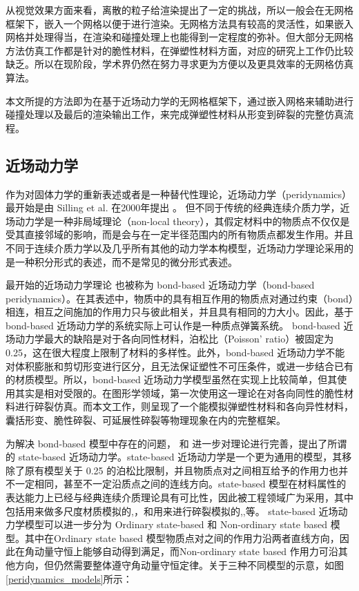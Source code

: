 从视觉效果方面来看，离散的粒子给渲染提出了一定的挑战，所以一般会在无网格框架下，嵌入一个网格以便于进行渲染。无网格方法具有较高的灵活性，如果嵌入网格并处理得当，在渲染和碰撞处理上也能得到一定程度的弥补。但大部分无网格方法仿真工作都是针对的脆性材料，在弹塑性材料方面，对应的研究上工作仍比较缺乏。所以在现阶段，学术界仍然在努力寻求更为方便以及更具效率的无网格仿真算法。

本文所提的方法即为在基于近场动力学的无网格框架下，通过嵌入网格来辅助进行碰撞处理以及最后的渲染输出工作，来完成弹塑性材料从形变到碎裂的完整仿真流程。

\subsection{近场动力学}
\label{pdm_history}

作为对固体力学的重新表述或者是一种替代性理论，近场动力学（peridynamics）最开始是由 Silling et al. 在2000年提出 。 但不同于传统的经典连续介质力学，近场动力学是一种非局域理论（non-local theory），其假定材料中的物质点不仅仅是受其直接邻域的影响，而是会与在一定半径范围内的所有物质点都发生作用。并且不同于连续介质力学以及几乎所有其他的动力学本构模型，近场动力学理论采用的是一种积分形式的表述，而不是常见的微分形式表述。

最开始的近场动力学理论 也被称为 bond-based 近场动力学（bond-based peridynamics）。在其表述中，物质中的具有相互作用的物质点对通过约束（bond）相连，相互之间施加的作用力只与彼此相关，并且具有相同的力大小。因此，基于 bond-based 近场动力学的系统实际上可认作是一种质点弹簧系统。 bond-based 近场动力学最大的缺陷是对于各向同性材料，泊松比（Poisson' ratio）被固定为 0.25，这在很大程度上限制了材料的多样性。此外，bond-based 近场动力学不能对体积膨胀和剪切形变进行区分，且无法保证塑性不可压条件，或进一步结合已有的材质模型。所以，bond-based 近场动力学模型虽然在实现上比较简单，但其使用其实是相对受限的。在图形学领域，第一次使用这一理论在对各向同性的脆性材料进行碎裂仿真。而本文工作，则呈现了一个能模拟弹塑性材料和各向异性材料，囊括形变、脆性碎裂、可延展性碎裂等物理现象在内的完整框架。

为解决 bond-based 模型中存在的问题， 和 进一步对理论进行完善，提出了所谓的 state-based 近场动力学。state-based 近场动力学是一个更为通用的模型，其移除了原有模型关于 0.25 的泊松比限制，并且物质点对之间相互给予的作用力也并不一定相同，甚至不一定沿质点之间的连线方向。state-based 模型在材料属性的表达能力上已经与经典连续介质理论具有可比性，因此被工程领域广为采用，其中包括用来做多尺度材质模拟的,，和用来进行碎裂模拟的,,等。
state-based 近场动力学模型可以进一步分为 Ordinary state-based 和 Non-ordinary state based 模型。其中在Ordinary state based 模型物质点对之间的作用力沿两者直线方向，因此在角动量守恒上能够自动得到满足，而Non-ordinary state based 作用力可沿其他方向，但仍然需要整体遵守角动量守恒定律。关于三种不同模型的示意，如图\ref{peridynamics_models}所示：

